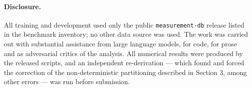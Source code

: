 \documentclass{article}
\begin{document}
\paragraph{Disclosure.} All training and development used only the public
\texttt{measurement-db} release listed in the benchmark inventory; no other data
source was used. The work was carried out with substantial assistance from large
language models, for code, for prose and as adversarial critics of the analysis.
All numerical results were produced by the released scripts, and an independent
re-derivation --- which found and forced the correction of the non-deterministic
partitioning described in Section 3, among other errors --- was run before
submission.
\end{document}
